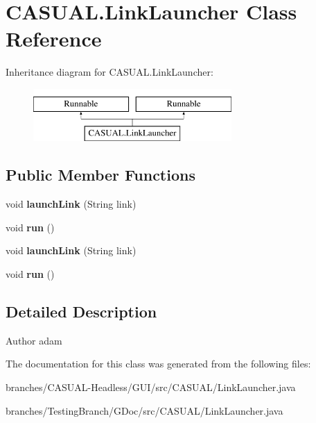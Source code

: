 \hypertarget{classCASUAL_1_1LinkLauncher}{\section{C\-A\-S\-U\-A\-L.\-Link\-Launcher Class Reference}
\label{classCASUAL_1_1LinkLauncher}
}
Inheritance diagram for C\-A\-S\-U\-A\-L.\-Link\-Launcher\-:\begin{figure}[H]
\begin{center}
\leavevmode
\includegraphics[height=2.000000cm]{classCASUAL_1_1LinkLauncher}
\end{center}
\end{figure}
\subsection*{Public Member Functions}
\begin{DoxyCompactItemize}
\item 
\hypertarget{classCASUAL_1_1LinkLauncher_a857267bfe6dd77a071c3292fd844928b}{void {\bfseries launch\-Link} (String link)}\label{classCASUAL_1_1LinkLauncher_a857267bfe6dd77a071c3292fd844928b}

\item 
\hypertarget{classCASUAL_1_1LinkLauncher_a6b88e74888a1ea9dc4e5a4c439ae97a0}{void {\bfseries run} ()}\label{classCASUAL_1_1LinkLauncher_a6b88e74888a1ea9dc4e5a4c439ae97a0}

\item 
\hypertarget{classCASUAL_1_1LinkLauncher_a857267bfe6dd77a071c3292fd844928b}{void {\bfseries launch\-Link} (String link)}\label{classCASUAL_1_1LinkLauncher_a857267bfe6dd77a071c3292fd844928b}

\item 
\hypertarget{classCASUAL_1_1LinkLauncher_a6b88e74888a1ea9dc4e5a4c439ae97a0}{void {\bfseries run} ()}\label{classCASUAL_1_1LinkLauncher_a6b88e74888a1ea9dc4e5a4c439ae97a0}

\end{DoxyCompactItemize}


\subsection{Detailed Description}
\begin{DoxyAuthor}{Author}
adam 
\end{DoxyAuthor}


The documentation for this class was generated from the following files\-:\begin{DoxyCompactItemize}
\item 
branches/\-C\-A\-S\-U\-A\-L-\/\-Headless/\-G\-U\-I/src/\-C\-A\-S\-U\-A\-L/Link\-Launcher.\-java\item 
branches/\-Testing\-Branch/\-G\-Doc/src/\-C\-A\-S\-U\-A\-L/Link\-Launcher.\-java\end{DoxyCompactItemize}
